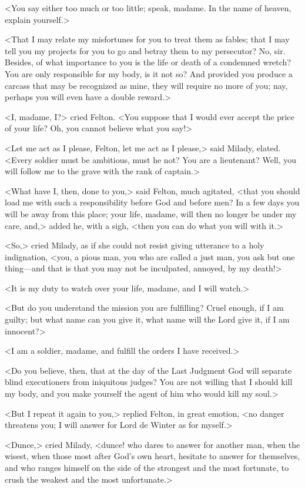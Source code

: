 <You say either too much or too little; speak, madame. In the name of heaven, explain yourself.> 

<That I may relate my misfortunes for you to treat them as fables; that I may tell you my projects for you to go and betray them to my persecutor? No, sir. Besides, of what importance to you is the life or death of a condemned wretch? You are only responsible for my body, is it not so? And provided you produce a carcass that may be recognized as mine, they will require no more of you; nay, perhaps you will even have a double reward.> 

<I, madame, I?> cried Felton. <You suppose that I would ever accept the price of your life? Oh, you cannot believe what you say!> 

<Let me act as I please, Felton, let me act as I please,> said Milady, elated. <Every soldier must be ambitious, must he not? You are a lieutenant? Well, you will follow me to the grave with the rank of captain.> 

<What have I, then, done to you,> said Felton, much agitated, <that you should load me with such a responsibility before God and before men? In a few days you will be away from this place; your life, madame, will then no longer be under my care, and,> added he, with a sigh, <then you can do what you will with it.> 

<So,> cried Milady, as if she could not resist giving utterance to a holy indignation, <you, a pious man, you who are called a just man, you ask but one thing—and that is that you may not be inculpated, annoyed, by my death!> 

<It is my duty to watch over your life, madame, and I will watch.> 

<But do you understand the mission you are fulfilling? Cruel enough, if I am guilty; but what name can you give it, what name will the Lord give it, if I am innocent?> 

<I am a soldier, madame, and fulfill the orders I have received.> 

<Do you believe, then, that at the day of the Last Judgment God will separate blind executioners from iniquitous judges? You are not willing that I should kill my body, and you make yourself the agent of him who would kill my soul.> 

<But I repeat it again to you,> replied Felton, in great emotion, <no danger threatens you; I will answer for Lord de Winter as for myself.> 

<Dunce,> cried Milady, <dunce! who dares to answer for another man, when the wisest, when those most after God's own heart, hesitate to answer for themselves, and who ranges himself on the side of the strongest and the most fortunate, to crush the weakest and the most unfortunate.> 

